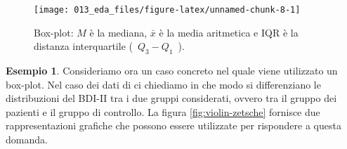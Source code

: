 \documentclass[
  10pt,
  italian,
  a4paper,
  extrafontsizes,onecolumn,openright
  ]{memoir}
\newenvironment{Shaded}{\begin{snugshade}}{\end{snugshade}}
\newcommand{\AttributeTok}[1]{\textcolor[rgb]{0.77,0.63,0.00}{#1}}
\newcommand{\ConstantTok}[1]{\textcolor[rgb]{0.00,0.00,0.00}{#1}}
\newcommand{\FunctionTok}[1]{\textcolor[rgb]{0.00,0.00,0.00}{#1}}
\newcommand{\NormalTok}[1]{#1}
\newcommand{\OtherTok}[1]{\textcolor[rgb]{0.56,0.35,0.01}{#1}}
\newcommand{\SpecialCharTok}[1]{\textcolor[rgb]{0.00,0.00,0.00}{#1}}
\newcommand{\StringTok}[1]{\textcolor[rgb]{0.31,0.60,0.02}{#1}}
\theoremstyle{definition}
\theoremstyle{definition}
\newtheorem{example}{Esempio}[chapter]
\theoremstyle{definition}
\theoremstyle{definition}
\theoremstyle{remark}
\begin{document}
\begin{figure}[h]

{\centering \texttt{[image: 013\_eda\_files/figure-latex/unnamed-chunk-8-1]} 

}

\caption{Box-plot: $M$ è la mediana, $\bar{x}$ è la media aritmetica e IQR è la distanza interquartile (~$Q_3 - Q_1$~).}\label{fig:unnamed-chunk-8}
\end{figure}

\begin{example}
Consideriamo ora un caso concreto nel quale viene utilizzato un box-plot.
Nel caso dei dati di \textcite{zetschefuture2019} ci chiediamo in che modo si differenziano le distribuzioni del BDI-II tra i due gruppi considerati, ovvero tra il gruppo dei pazienti e il gruppo di controllo. La figura \ref{fig:violin-zetsche} fornisce due rappresentazioni grafiche che possono essere utilizzate per rispondere a questa domanda.

\begin{Shaded}
\end{Shaded}
\end{example}
\end{document}
